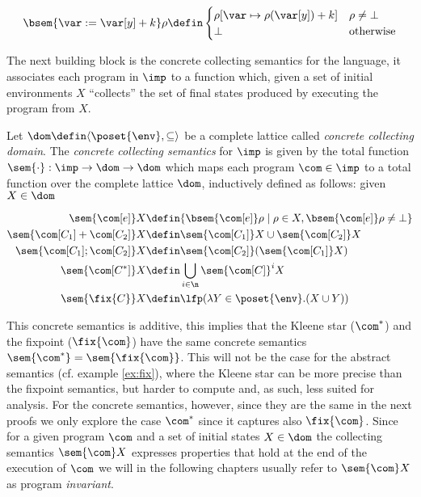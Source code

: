 \begin{definition}
\begin{align*}
    \bsem{\var:= \var[y] + k} \rho & \defin \begin{cases} \rho [\var\mapsto \rho(\var[y]) + k] & \rho \neq \bot \\ \bot & \text{otherwise}\end{cases} \\
  \end{align*}
\end{definition}

The next building block is the concrete collecting semantics for the
language, it associates each program in \(\imp\) to a function which,
given a set of initial environments \(X\) ``collects'' the set of
final states produced by executing the program from \(X\).

\begin{definition}
  Let \(\dom \defin \langle \poset{\env} , \subseteq \rangle\) be a
  complete lattice called \emph{concrete collecting domain}. The
  \emph{concrete collecting semantics} for \(\imp\) is given by the
  total function \(\sem{\cdot} : \imp \to \dom \to \dom\) which maps
  each program \(\com \in \imp\) to a total function over the complete
  lattice \(\dom\), inductively defined as follows: given
  \(X \in \dom\)

  \begin{align*}
    \sem{\com[e]} X & \defin \{\bsem{\com[e]} \rho \mid \rho \in X,
    \bsem{\com[e]} \rho \neq \bot\} \\
    \sem{\com[C_1] + \com[C_2]} X & \defin \sem{\com[C_1]} X \cup \sem{\com[C_2]} X \\
    \sem{\com[C_1] ; \com[C_2]} X & \defin \sem{\com[C_2]}(\sem{\com[C_1]} X) \\
    \sem{\com[C^*]} X & \defin \bigcup_{i \in \n} \sem{\com[C]}^i X \\
    \sem{\fix{C}} X & \defin \lfp(\lambda Y \in\poset{\env} . (X \cup Y))
  \end{align*}
\end{definition}

This concrete semantics is additive, this implies that the Kleene star
(\(\com^*\)) and the fixpoint (\(\fix{\com}\)) have the same concrete
semantics \(\sem{\com^*} = \sem{\fix{\com}}\).  This will not be the
case for the abstract semantics (cf. example \ref{ex:fix}), where the
Kleene star can be more precise than the fixpoint semantics, but
harder to compute and, as such, less suited for analysis. For the
concrete semantics, however, since they are the same in the next
proofs we only explore the case \(\com^*\) since it captures also
\(\fix{\com}\). Since for a given program \(\com\) and a set of
initial states \(X \in \dom\) the collecting semantics \(\sem{\com}X\)
expresses properties that hold at the end of the execution of \(\com\)
we will in the following chapters usually refer to \(\sem{\com}X\) as
program \emph{invariant}.


